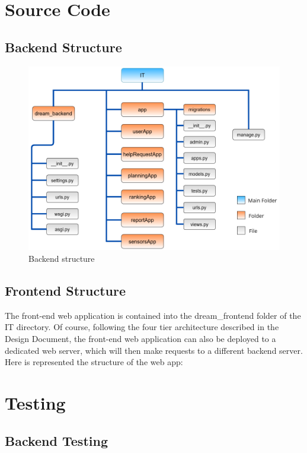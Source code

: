 \documentclass[table, 12pt]{article}
\begin{document}
\section{Source Code}
\subsection{Backend Structure}
\begin{center}
    \begin{figure}[H]
        \includegraphics[scale=0.65, center]{assets/backend_structure.png}
        \caption{Backend structure}
        \label{fig: backend_structure}
    \end{figure}
\end{center}

\subsection{Frontend Structure}

The front-end web application is contained into the dream\_frontend folder of
the IT directory.
Of course, following the four tier architecture described in the Design Document,
the front-end web application can also be deployed to a dedicated web server,
which will then make requests to a different backend server.
Here is represented the structure of the web app:



\section{Testing}
\subsection{Backend Testing}
\end{document}
